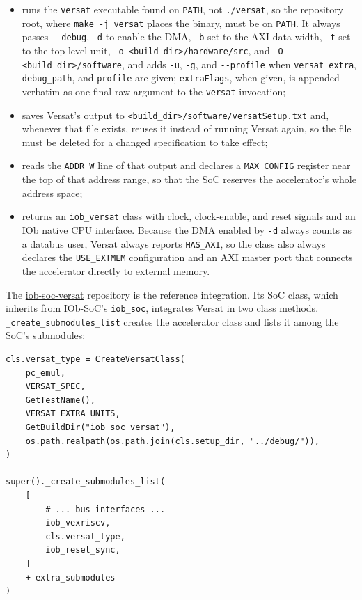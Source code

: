 \begin{itemize}
  \itemsep-0.5em
  \item runs the \texttt{versat} executable found on \texttt{PATH}, not \texttt{./versat}, so the repository root, where \texttt{make -j versat} places the binary, must be on \texttt{PATH}. It always passes \texttt{-{}-debug}, \texttt{-d} to enable the DMA, \texttt{-b} set to the AXI data width, \texttt{-t} set to the top-level unit, \texttt{-o <build\_dir>/hardware/src}, and \texttt{-O <build\_dir>/software}, and adds \texttt{-u}, \texttt{-g}, and \texttt{-{}-profile} when \texttt{versat\_extra}, \texttt{debug\_path}, and \texttt{profile} are given; \texttt{extraFlags}, when given, is appended verbatim as one final raw argument to the \texttt{versat} invocation;
  \item saves Versat's output to \texttt{<build\_dir>/software/versatSetup.txt} and, whenever that file exists, reuses it instead of running Versat again, so the file must be deleted for a changed specification to take effect;
  \item reads the \texttt{ADDR\_W} line of that output and declares a \texttt{MAX\_CONFIG} register near the top of that address range, so that the SoC reserves the accelerator's whole address space;
  \item returns an \texttt{iob\_versat} class with clock, clock-enable, and reset signals and an IOb native CPU interface. Because the DMA enabled by \texttt{-d} always counts as a databus user, Versat always reports \texttt{HAS\_AXI}, so the class also always declares the \texttt{USE\_EXTMEM} configuration and an AXI master port that connects the accelerator directly to external memory.
\end{itemize}

The \href{https://github.com/IObundle/iob-soc-versat}{iob-soc-versat} repository is the reference integration. Its SoC class, which inherits from IOb-SoC's \texttt{iob\_soc}, integrates Versat in two class methods. \texttt{\_create\_submodules\_list} creates the accelerator class and lists it among the SoC's submodules:

\begin{lstlisting}[caption={iob\_soc\_versat.py}]
cls.versat_type = CreateVersatClass(
    pc_emul,
    VERSAT_SPEC,
    GetTestName(),
    VERSAT_EXTRA_UNITS,
    GetBuildDir("iob_soc_versat"),
    os.path.realpath(os.path.join(cls.setup_dir, "../debug/")),
)

super()._create_submodules_list(
    [
        # ... bus interfaces ...
        iob_vexriscv,
        cls.versat_type,
        iob_reset_sync,
    ]
    + extra_submodules
)
\end{lstlisting}

